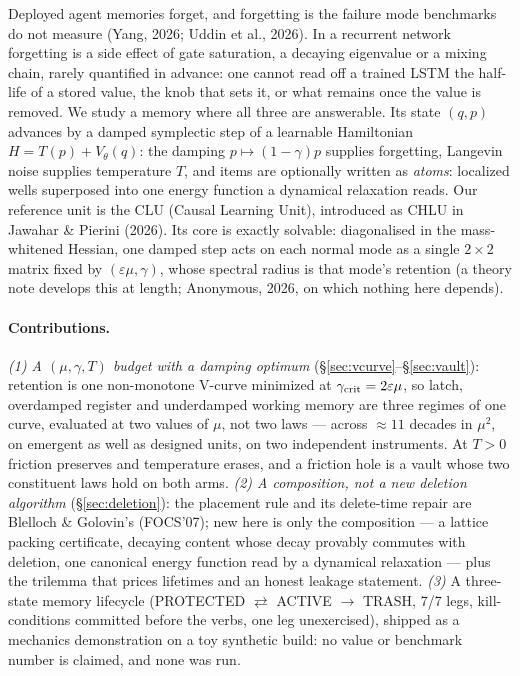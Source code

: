 \documentclass{article}
\begin{document}
Deployed agent memories forget, and forgetting is the failure mode benchmarks do not measure (Yang, 2026; Uddin et al., 2026). In a recurrent network forgetting is a side effect of gate saturation, a decaying eigenvalue or a mixing chain, rarely quantified in advance: one cannot read off a trained LSTM the half-life of a stored value, the knob that sets it, or what remains once the value is removed. We study a memory where all three are answerable. Its state $(q,p)$ advances by a damped symplectic step of a learnable Hamiltonian $H=T(p)+V_\theta(q)$: the damping $p\mapsto(1-\gamma)p$ supplies forgetting, Langevin noise supplies temperature $T$, and items are optionally written as \emph{atoms}: localized wells superposed into one energy function a dynamical relaxation reads. Our reference unit is the CLU (Causal Learning Unit), introduced as CHLU in Jawahar \& Pierini (2026). Its core is exactly solvable: diagonalised in the mass-whitened Hessian, one damped step acts on each normal mode as a single $2\times2$ matrix fixed by $(\varepsilon\mu,\gamma)$, whose spectral radius is that mode's retention (a theory note develops this at length; Anonymous, 2026, on which nothing here depends).

\paragraph{Contributions.} \emph{(1) A $(\mu,\gamma,T)$ budget with a damping optimum} (\S\ref{sec:vcurve}--\S\ref{sec:vault}): retention is one non-monotone V-curve minimized at $\gamma_{\rm crit}=2\varepsilon\mu$, so latch, overdamped register and underdamped working memory are three regimes of one curve, evaluated at two values of $\mu$, not two laws --- across $\approx11$ decades in $\mu^2$, on emergent as well as designed units, on two independent instruments. At $T>0$ friction preserves and temperature erases, and a friction hole is a vault whose two constituent laws hold on both arms. \emph{(2) A composition, not a new deletion algorithm} (\S\ref{sec:deletion}): the placement rule and its delete-time repair are Blelloch \& Golovin's (FOCS'07); new here is only the composition --- a lattice packing certificate, decaying content whose decay provably commutes with deletion, one canonical energy function read by a dynamical relaxation --- plus the trilemma that prices lifetimes and an honest leakage statement. \emph{(3)} A three-state memory lifecycle (PROTECTED $\rightleftarrows$ ACTIVE $\to$ TRASH, 7/7 legs, kill-conditions committed before the verbs, one leg unexercised), shipped as a mechanics demonstration on a toy synthetic build: no value or benchmark number is claimed, and none was run.
\end{document}
